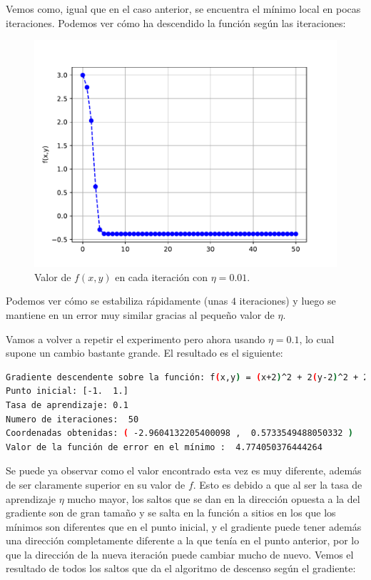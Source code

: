 \documentclass[12pt]{scrartcl}
\begin{document}
{Vemos como, igual que en el caso anterior, se encuentra el mínimo local en pocas iteraciones. Podemos ver cómo ha descendido la función según las iteraciones:

\begin{figure}[H]
  \centering
  \includegraphics[scale=0.7]{media/f_evolution_e1-2-001.pdf}
  \caption{Valor de $f(x,y)$ en cada iteración con $\eta = 0.01$.}
\end{figure}

Podemos ver cómo se estabiliza rápidamente (unas $4$ iteraciones) y luego se mantiene en un error muy similar gracias al pequeño valor de $\eta$.

Vamos a volver a repetir el experimento pero ahora usando $\eta = 0.1$, lo cual supone un cambio bastante grande. El resultado es el siguiente:

\begin{lstlisting}[language=bash]
Gradiente descendente sobre la función: f(x,y) = (x+2)^2 + 2(y-2)^2 + 2 sin(2pi x) sin(2pi y)
Punto inicial: [-1.  1.]
Tasa de aprendizaje: 0.1
Numero de iteraciones:  50
Coordenadas obtenidas: ( -2.9604132205400098 ,  0.5733549488050332 )
Valor de la función de error en el mínimo :  4.774050376444264
\end{lstlisting}

Se puede ya observar como el valor encontrado esta vez es muy diferente, además de ser claramente superior en su valor de $f$. 
Esto es debido a que al ser la tasa de aprendizaje $\eta$ mucho mayor, los saltos que se dan en la dirección opuesta a la del gradiente son de gran tamaño y se salta en la función a sitios en los que los mínimos son
diferentes que en el punto inicial, y el gradiente puede tener además una dirección completamente diferente a la que tenía en el punto anterior, por lo que la dirección de la nueva iteración puede cambiar mucho de nuevo. Vemos el resultado de todos los saltos que
da el algoritmo de descenso según el gradiente:

}
\end{document}
